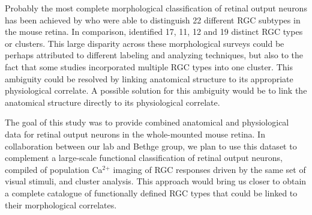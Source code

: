 Probably the most complete morphological classification of retinal output neurons has been achieved by \citet{voelgyi09} who were able to distinguish 22 different RGC subtypes in the mouse retina. In comparison, \citet{sun02} identified 17, \citet{kong05} 11, \citet{badea04} 12 and \citet{coombs06} 19 distinct RGC types or clusters. This large disparity across these morphological surveys could be perhaps attributed to different labeling and analyzing techniques, but also to the fact that some studies incorporated multiple RGC types into one cluster. This ambiguity could be resolved by linking anatomical structure to its appropriate physiological correlate. A possible solution for this ambiguity would be to link the anatomical structure directly to its physiological correlate. 

The goal of this study was to provide combined anatomical and physiological data for retinal output neurons in the whole-mounted mouse retina. In collaboration between our lab and Bethge group, we plan to use this dataset to complement a large-scale functional classification of retinal output neurons, compiled of population Ca$^{\text{2+}}$ imaging of RGC responses driven by the same set of visual stimuli, and cluster analysis. This approach would bring us closer to obtain a complete catalogue of functionally defined RGC types that could be linked to their morphological correlates.





